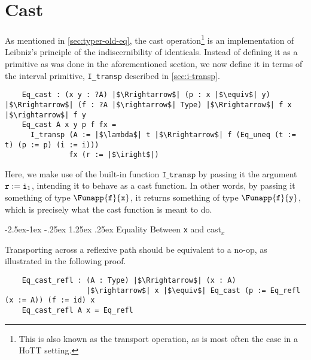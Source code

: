 \documentclass[12pt,twoside,maitrise]{dms}
\makeatletter
\theoremstyle{definition}
\numberwithin{equation}{section}
\numberwithin{table}{chapter}
\numberwithin{figure}{chapter}
\newcommand\kw[1] {\textsf{#1}}
\newcommand\id[1] {\texttt{#1}}
\renewcommand\paragraph{\@startsection{paragraph}{4}{\z@}%
            {-2.5ex\@plus -1ex \@minus -.25ex}%
            {1.25ex \@plus .25ex}%
            {\normalfont\normalsize\bfseries}}
\makeatother
\begin{document}
\section{Cast}\label{sec:eq-transport}
As mentioned in \autoref{sec:typer-old-eq}, the cast operation\footnote{This is
also known as the transport operation, as is most often the case in a HoTT
setting.} is an implementation of Leibniz's principle of the indiscernibility of
identicals. Instead of defining it as a primitive as was done in the
aforementioned section, we now define it in terms of the interval primitive,
\id{I\_transp} described in \autoref{sec:i-transp}.


\begin{verbatim}
    Eq_cast : (x y : ?A) |$\Rrightarrow$| (p : x |$\equiv$| y) |$\Rrightarrow$| (f : ?A |$\rightarrow$| Type) |$\Rrightarrow$| f x |$\rightarrow$| f y
    Eq_cast A x y p f fx =
      I_transp (A := |$\lambda$| t |$\Rrightarrow$| f (Eq_uneq (t := t) (p := p) (i := i)))
               fx (r := |$\iright$|)
\end{verbatim}

Here, we make use of the built-in function $\id{I\_transp}$ by passing it the
argument $\earg{\id{r}}{\iright}$, intending it to behave as a cast function. In
other words, by passing it something of type $\Funapp{\id{f}}{\id{x}}$, it
returns something of type $\Funapp{\id{f}}{\id{y}}$, which is precisely what the
cast function is meant to do.

\paragraph{Equality Between \id{x} and \kw{cast}$_x$}\label{app:cast-is-eq}

Transporting across a reflexive path should be equivalent to a no-op, as
illustrated in the following proof.

\begin{verbatim}
    Eq_cast_refl : (A : Type) |$\Rrightarrow$| (x : A)
                   |$\rightarrow$| x |$\equiv$| Eq_cast (p := Eq_refl (x := A)) (f := id) x
    Eq_cast_refl A x = Eq_refl
\end{verbatim}
\end{document}
